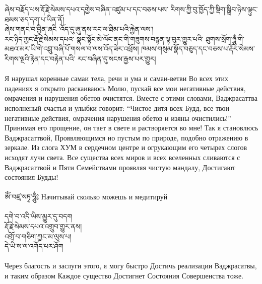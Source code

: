 ཞེས་བརྗོད་པས་རྡོ་རྗེ་སེམས་དཔའ་དགྱེས་བཞིན་འཛུམ་པ་དང་བཅས་པས་ རིགས་ཀྱི་བུ་ཁྱོད་ཀྱི་སྡིག་སྒྲིབ་ཉེས་ལྟུང་ཐམས་ཅད་དག་པ་ཡིན་ནོ། \\
ཞེས་གནང་བ་བྱིན་ཞངི ་འོད་དུ་ཞུ་ནས་རང་ལ་ཐིམ་པའི་རྐྱེན་ལས་། \\
རང་ཉིད་ཀྱང་རྡོ་རྗེ་སེམས་དཔའ་ སྣང་སྟོང་མེ་ལོང་ནང་གི་གཟུགས་བརྙན་ལྟ་བུར་གྱུར་པའི་ ཐུགས་སྲོག་ཧཱུྂ་གི་མཐའ་མར་ཡི་གེ་འབྲུ་བཞི་པོ་གསལ་བ་ལས་འོད་ཟེར་འཕྲོས། ཁམས་གསུམ་སྣོད་བཅུད་དང་བཅས་པ་རྡོར་སེམས་རིགས་ལྔའི་རྟེན་དང་བརྟེན་པའི་ རང་བཞིན་དུ་སངས་རྒྱས་པར་གྱུར།\\
\\
\ru
Я нарушал коренные самаи тела, речи и ума и самаи-ветви
Во всех этих падениях я открыто раскаиваюсь
Молю, пускай все мои негативные действия, омрачения и нарушения обетов очистятся.
Вместе с этими словами, Ваджрасаттва исполненый счастья и улыбки говорит:
“Чистое дитя всех Будд, все твои негативные действия, омрачения
нарушения обетов и изяны очистились!”
Принимая его прощение, он тает в свете и раство\-ряется во мне!
Так я становлюсь Ваджрасаттвой,
Проявляющи\-мся но пустым по природе, подобно отражению в зеркале.
Из слога ХУМ в сердечном центре и огрукающим его четырех слогов исходят лучи света.
Все существа всех миров и всех вселенных
сливаются с Ваджрасаттвой и Пяти Семействами проявляя чистую мандалу,
Достигают состояния Будды!\\
\\
\ti
ཨོཾ་བཛྲ་སཏྭ་ཧཱུྂ༔ \ru Начитывай сколько можешь и медитируй\\
\\
\ti
དགེ་བ་འདི་ཡིས་མྱུར་དུ་བདག \\
རྡོ་རྗེ་སེམས་དཔའ་འགྲུབ་གྱུར་ནས། \\
འགྲོ་བ་གཅིག་ཀྱང་མ་ལུས་པ། \\
དེ་ཡི་ས་ལ་འགོད་པར་ཤོག\\
\\
\ru
Через благость и заслуги этого, я могу быстро Достичь реализации Ваджрасатвы, и таким образом Каждое существо
Достигнет Состояния Совершенства тоже.


